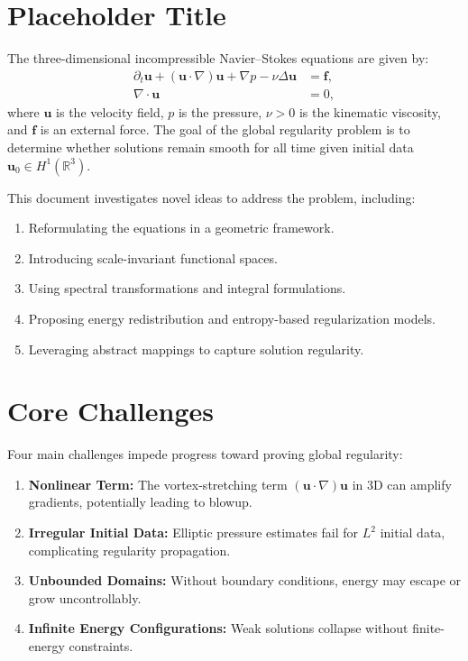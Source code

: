 \section{Placeholder Title}
The three-dimensional incompressible Navier--Stokes equations are given by:
\begin{align}
    \partial_t \mathbf{u} + (\mathbf{u} \cdot \nabla)\mathbf{u} + \nabla p - \nu \Delta \mathbf{u} &= \mathbf{f}, \label{momentum} \\
    \nabla \cdot \mathbf{u} &= 0, \label{incompressibility}
\end{align}
where $\mathbf{u}$ is the velocity field, $p$ is the pressure, $\nu > 0$ is the kinematic viscosity, and $\mathbf{f}$ is an external force. The goal of the global regularity problem is to determine whether solutions remain smooth for all time given initial data $\mathbf{u}_0 \in H^1(\mathbb{R}^3)$.

This document investigates novel ideas to address the problem, including:
\begin{enumerate}[label=\textbf{\arabic*.}]
    \item Reformulating the equations in a geometric framework.
    \item Introducing scale-invariant functional spaces.
    \item Using spectral transformations and integral formulations.
    \item Proposing energy redistribution and entropy-based regularization models.
    \item Leveraging abstract mappings to capture solution regularity.
\end{enumerate}

\section{Core Challenges}
Four main challenges impede progress toward proving global regularity:
\begin{enumerate}[label=\textbf{(\roman*)}]
    \item \textbf{Nonlinear Term:} The vortex-stretching term $(\mathbf{u} \cdot \nabla)\mathbf{u}$ in 3D can amplify gradients, potentially leading to blowup.
    \item \textbf{Irregular Initial Data:} Elliptic pressure estimates fail for $L^2$ initial data, complicating regularity propagation.
    \item \textbf{Unbounded Domains:} Without boundary conditions, energy may escape or grow uncontrollably.
    \item \textbf{Infinite Energy Configurations:} Weak solutions collapse without finite-energy constraints.
\end{enumerate}


